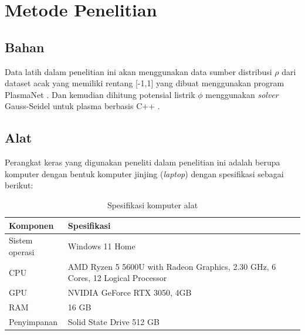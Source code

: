 \chapter{Metode Penelitian}

\section{Bahan}
Data latih dalam penelitian ini akan menggunakan data sumber distribusi $\rho$
dari dataset acak yang memiliki rentang [-1,1] yang dibuat menggunakan program PlasmaNet
\citep{cheng_illarramendi_bauerheim_cuenot_2021}. Dan kemudian dihitung potensial
listrik $\phi$ menggunakan \emph{solver} Gauss-Seidel untuk plasma berbasis C++
\citep{lubos_brieda_2019}.

\section{Alat}
Perangkat keras yang digunakan peneliti dalam penelitian ini adalah berupa komputer
dengan bentuk komputer jinjing (\emph{laptop}) dengan spesifikasi sebagai
berikut:

\begin{table}[ht]
  \centering
  \caption{Spesifikasi komputer alat}
  \begin{tabular}{|M{3cm}|M{4cm}|}
    \hline
    \textbf{Komponen} & \textbf{Spesifikasi}                                                            \\
    \hline
    Sistem operasi    & Windows 11 Home                                                                 \\
    \hline
    CPU               & AMD Ryzen 5 5600U with Radeon Graphics, 2.30 GHz, 6 Cores, 12 Logical Processor \\
    \hline
    GPU               & NVIDIA GeForce RTX 3050, 4GB                                                    \\
    \hline
    RAM               & 16 GB                                                                           \\
    \hline
    Penyimpanan       & Solid State Drive 512 GB                                                        \\
    \hline
  \end{tabular}
\end{table}

